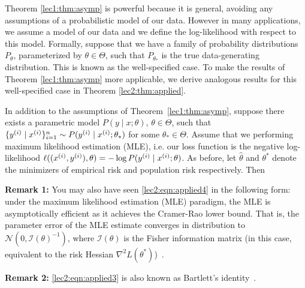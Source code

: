 
Theorem \ref{lec1:thm:asymp} is powerful because it is general, avoiding any assumptions of a probabilistic model of our data. However in many applications, we assume a model of our data and we define the log-likelihood with respect to this model. Formally, suppose that we have a family of probability distributions $P_\theta$, parameterized by $\theta \in \Theta$, such that $P_{\theta_*}$ is the true data-generating distribution. This is known as the well-specified case. To make the results of Theorem \ref{lec1:thm:asymp} more applicable, we derive analogous results for this well-specified case in Theorem \ref{lec2:thm:applied}.

\begin{theorem}
\label{lec2:thm:applied}
    In addition to the assumptions of Theorem~\ref{lec1:thm:asymp}, suppose there exists a parametric model $P(y \mid x; \theta)$, $\theta \in \Theta$, such that $\{ y\sp{i} \mid x\sp{i} \}_{i=1}^n \sim P( y\sp{i} \mid x\sp{i} ; \theta_*)$ for some $\theta_* \in \Theta$. Assume that we performing maximum likelihood estimation (MLE), i.e. our loss function is the negative log-likelihood $\ell((x\sp{i}, y\sp{i}), \theta) = - \log P( y\sp{i} \mid x\sp{i} ; \theta)$. As before, let $\hat\theta$ and $\theta^*$ denote the minimizers of empirical risk and population risk respectively. Then
    \al{
    \label{lec2:eqn:applied1}
        \theta^* = \theta_*,
    }
\end{theorem}

\textbf{Remark 1:} You may also have seen \eqref{lec2:eqn:applied4} in the following form: under the maximum likelihood estimation (MLE) paradigm, the MLE is asymptotically efficient as it achieves the Cramer-Rao lower bound. That is, the parameter error of the MLE estimate converges in distribution to $\mathcal{N}(0, \mathcal{I}(\theta)^{-1})$, where $\mathcal{I}(\theta)$ is the Fisher information matrix (in this case, equivalent to the risk Hessian $\nabla^2 L(\theta^*)$)~\cite{rice2006mathematical}.

\textbf{Remark 2:} \eqref{lec2:eqn:applied3} is also known as Bartlett's identity~\cite{percynotes}.

